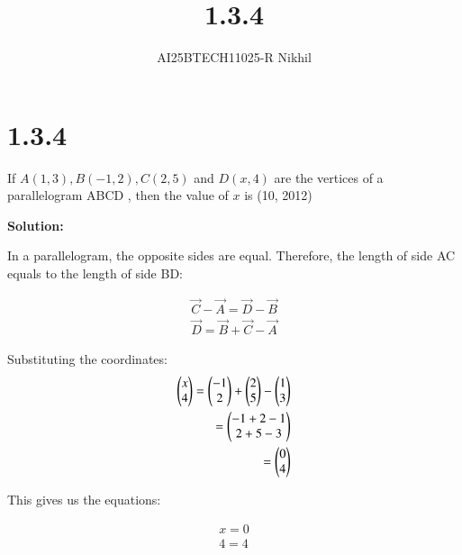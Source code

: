 \documentclass[journal]{IEEEtran}
\begin{document}

\vspace{3cm}

\title{1.3.4}
\author{AI25BTECH11025-R Nikhil}
 \maketitle
{\let\newpage\relax\maketitle}

\renewcommand{\thefigure}{\theenumi}
\renewcommand{\thetable}{\theenumi}
\setlength{\intextsep}{10pt} %


\renewcommand{\thetable}{\theenumi}


\section*{1.3.4}
If $ A(1, 3), B(-1, 2), C(2, 5) $ and $ D(x, 4) $ are the vertices of a parallelogram  ABCD , then the value of $x$ is \underline{\hspace{2cm}}(10, 2012)

\vspace{1em}
\textbf{Solution:}

In a parallelogram, the opposite sides are equal. Therefore, the length of side AC equals to the length of side BD:

\begin{align}
\vec{C} - \vec{A} = \vec{D} - \vec{B} \\
\vec{D} = \vec{B} + \vec{C} - \vec{A}
\end{align}


Substituting the coordinates:
\begin{align}
\begin{pmatrix} x \\ 4 \end{pmatrix} = \begin{pmatrix} -1 \\ 2 \end{pmatrix} + \begin{pmatrix} 2 \\ 5 \end{pmatrix} - \begin{pmatrix} 1 \\ 3 \end{pmatrix} \\
                 = \begin{pmatrix} -1 + 2 - 1 \\ 2 + 5 - 3 \end{pmatrix} \\
                 = \begin{pmatrix} 0 \\ 4 \end{pmatrix}
\end{align}

This gives us the equations: 

\begin{align}
    x=0  \\
    4=4
\end{align}
\end{document}
